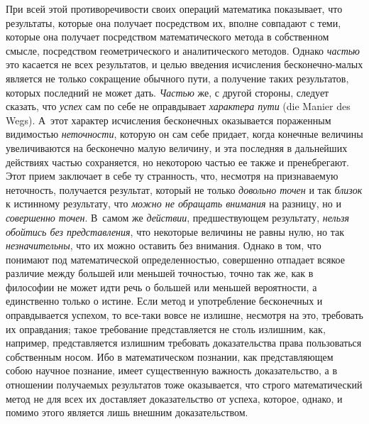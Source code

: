 При всей этой противоречивости своих операций математика показывает, что
результаты, которые она получает посредством их, вполне совпадают с теми,
которые она получает посредством математического метода в собственном смысле,
посредством геометрического и аналитического методов. Однако {\em частью} это
касается не всех результатов, и целью введения исчисления бесконечно-малых
является не только сокращение обычного пути, а получение таких результатов,
которых последний не может дать. {\em Частью} же, с другой стороны, следует
сказать, что {\em успех} сам по себе не оправдывает {\em характера пути} (die
Manier des Wegs). А~этот характер исчисления бесконечных оказывается пораженным
видимостью {\em неточности}, которую он сам себе придает, когда конечные
величины увеличиваются на бесконечно малую величину, и эта последняя в
дальнейших действиях частью сохраняется, но некоторою частью ее также и
пренебрегают. Этот прием заключает в себе ту странность, что, несмотря на
признаваемую неточность, получается результат, который не только
{\em довольно точен} и так {\em близок} к истинному результату, что
{\em можно не обращать внимания} на разницу, но и {\em совершенно точен}.
В~самом же {\em действии}, предшествующем результату,
{\em нельзя обойтись без представления}, что некоторые величины не равны нулю,
но так {\em незначительны}, что их можно оставить без внимания. Однако в том,
что понимают под математической определенностью, совершенно отпадает всякое
различие между большей или меньшей точностью, точно так же, как в философии не
может идти речь о большей или меньшей вероятности, а единственно только о
истине. Если метод и употребление бесконечных и оправдывается успехом, то
все-таки вовсе не излишне, несмотря на это, требовать их оправдания; такое
требование представляется не столь излишним, как, например, представляется
излишним требовать доказательства права пользоваться собственным
носом. Ибо в математическом
познании, как представляющем собою научное познание, имеет существенную
важность доказательство, а в отношении получаемых результатов тоже оказывается,
что строго математический метод не для всех их доставляет доказательство от
успеха, которое, однако, и помимо этого является лишь внешним доказательством.

